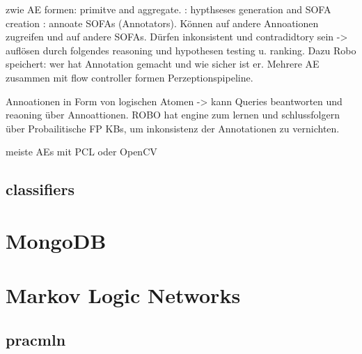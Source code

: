 zwie AE formen: primitve and aggregate. : hypthseses generation and SOFA creation : annoate SOFAs (Annotators). Können auf andere Annoationen zugreifen und auf andere SOFAs. Dürfen inkonsistent und contradidtory sein -> auflösen durch folgendes reasoning und hypothesen testing u. ranking. Dazu Robo speichert: wer hat Annotation gemacht und wie sicher ist er. \newline
Mehrere AE zusammen mit flow controller formen Perzeptionspipeline. \par
Annoationen in Form von logischen Atomen -> kann Queries beantworten und reaoning über Annoattionen. \newline
ROBO hat engine zum lernen und schlussfolgern über Probailitische FP KBs, um inkonsistenz der Annotationen zu vernichten. \par 
meiste AEs mit PCL oder OpenCV 
  
\subsection{classifiers}
\label{sec:classifiers}


\section{MongoDB}
\label{sec:mongodb}


\section{Markov Logic Networks}
\label{sec:mln}

\subsection{pracmln}
\label{subsec:pracmln}
